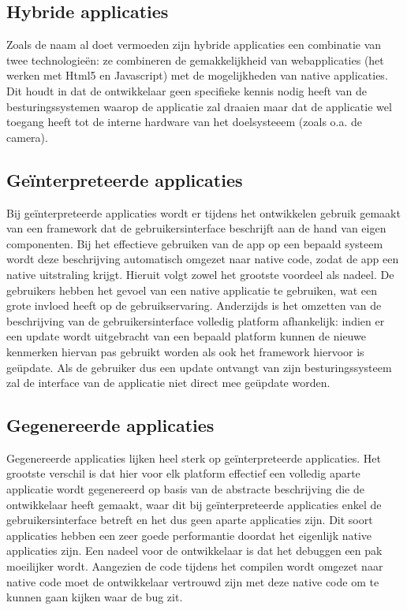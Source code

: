 \subsection{Hybride applicaties}

Zoals de naam al doet vermoeden zijn hybride applicaties een combinatie van twee technologieën: ze combineren de gemakkelijkheid van webapplicaties (het werken met Html5 en Javascript) met de mogelijkheden van native applicaties. Dit houdt in dat de ontwikkelaar geen specifieke kennis nodig heeft van de besturingssystemen waarop de applicatie zal draaien maar dat de applicatie wel toegang heeft tot de interne hardware van het doelsysteeem (zoals o.a. de camera). 

\subsection{Geïnterpreteerde applicaties}

Bij geïnterpreteerde applicaties wordt er tijdens het ontwikkelen gebruik gemaakt van een framework dat de gebruikersinterface beschrijft aan de hand van eigen componenten. Bij het effectieve gebruiken van de app op een bepaald systeem wordt deze beschrijving automatisch omgezet naar native code, zodat de app een native uitstraling krijgt. Hieruit volgt zowel het grootste voordeel als nadeel. De gebruikers hebben het gevoel van een native applicatie te gebruiken, wat een grote invloed heeft op de gebruikservaring. Anderzijds is het omzetten van de beschrijving van de gebruikersinterface volledig platform afhankelijk: indien er een update wordt uitgebracht van een bepaald platform kunnen de nieuwe kenmerken hiervan pas gebruikt worden als ook het framework hiervoor is geüpdate. Als de gebruiker dus een update ontvangt van zijn besturingssysteem zal de interface van de applicatie niet direct mee geüpdate worden.

\subsection{Gegenereerde applicaties}

Gegenereerde applicaties lijken heel sterk op geïnterpreteerde applicaties. Het grootste verschil is dat hier voor elk platform effectief een volledig aparte applicatie wordt gegenereerd op basis van de abstracte beschrijving die de ontwikkelaar heeft gemaakt, waar dit bij geïnterpreteerde applicaties enkel de gebruikersinterface betreft en het dus geen aparte applicaties zijn. Dit soort applicaties hebben een zeer goede performantie doordat het eigenlijk native applicaties zijn. Een nadeel voor de ontwikkelaar is dat het debuggen een pak moeilijker wordt. Aangezien de code tijdens het compilen wordt omgezet naar native code moet de ontwikkelaar vertrouwd zijn met deze native code om te kunnen gaan kijken waar de bug zit.



